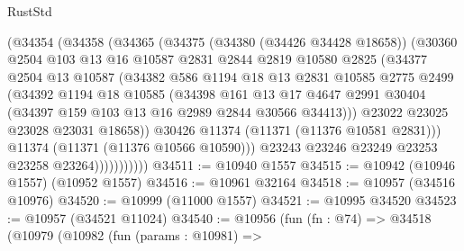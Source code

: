 \begin{lexlean}{RustStd}
\begin{coremodule}
                    (@34354
                      (@34358
                        (@34365
                          (@34375
                            (@34380 (@34426 @34428 @18658))
                            (@30360
                              @2504
                              @103
                              @13
                              @16
                              @10587
                              @2831
                              @2844
                              @2819
                              @10580
                              @2825
                              (@34377
                                @2504
                                @13
                                @10587
                                (@34382
                                  @586
                                  @1194
                                  @18
                                  @13
                                  @2831
                                  @10585
                                  @2775
                                  @2499
                                  (@34392
                                    @1194
                                    @18
                                    @10585
                                    (@34398
                                      @161
                                      @13
                                      @17
                                      @4647
                                      @2991
                                      @30404
                                      (@34397 @159 @103 @13 @16 @2989 @2844 @30566 @34413)))
                                  @23022
                                  @23025
                                  @23028
                                  @23031
                                  @18658))
                              @30426
                              @11374
                              (@11371 (@11376 @10581 @2831)))
                            @11374
                            (@11371 (@11376 @10566 @10590)))
                          @23243
                          @23246
                          @23249
                          @23253
                          @23258
                          @23264)))))))))))
@34511 := @10940 @1557
@34515 := @10942 (@10946 @1557) (@10952 @1557)
@34516 := @10961 @32164
@34518 := @10957 (@34516 @10976)
@34520 := @10999 (@11000 @1557)
@34521 := @10995 @34520
@34523 := @10957 (@34521 @11024)
@34540 := @10956
    (fun (fn : @74) =>
    @34518
      (@10979
        (@10982
          (fun (params : @10981) =>

\end{coremodule}
\end{lexlean}
